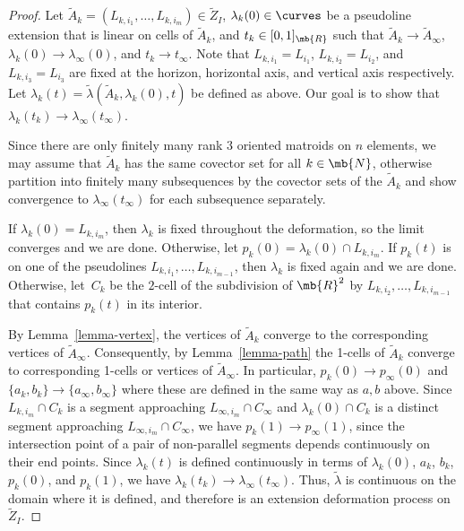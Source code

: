 \begin{proof}
Let $\tilde A_k = (L_{k,i_1},\dots,L_{k,i_m}) \in \tilde Z_{I}$, $\lambda_k(0) \in \curves$ be a pseudoline extension that is linear on cells of $\tilde A_k$, and $t_k \in [0,1]_\mb{R}$ such that $\tilde A_k \to \tilde A_\infty$, $\lambda_k(0) \to \lambda_\infty(0)$, and $t_k \to t_\infty$.
Note that $L_{k,i_1} = L_{i_1}$, $L_{k,i_2} = L_{i_2}$, and $L_{k,i_3} = L_{i_3}$ are fixed at the horizon, horizontal axis, and vertical axis respectively.
Let $\lambda_k(t) = \tilde \lambda(\tilde A_k,\lambda_k(0),t)$ be defined as above.
Our goal is to show that $\lambda_k(t_k) \to \lambda_\infty(t_\infty)$.

Since there are only finitely many rank $3$ oriented matroids on $n$ elements, we may assume that $\tilde A_k$ has the same covector set for all $k \in \mb{N}$, otherwise partition into finitely many subsequences by the covector sets of the $\tilde A_k$ and show convergence to $\lambda_\infty(t_\infty)$ for each subsequence separately.

If $\lambda_k(0) = L_{k,i_m}$, then $\lambda_k$ is fixed throughout the deformation, so the limit converges and we are done.
Otherwise, let $p_k(0) = \lambda_k(0) \cap L_{k,i_m}$.
If $p_{k}(t)$ is on one of the pseudolines $L_{k,i_1},\dots,L_{k,i_{m-1}}$, then $\lambda_k$ is fixed again and we are done.
Otherwise, let~$C_k$ be the $2$-cell of the subdivision of $\mb{R}^2$ by $L_{k,i_2},\dots,L_{k,i_{m-1}}$ that contains $p_{k}(t)$ in its interior.

By Lemma~\ref{lemma-vertex}, the vertices of $\tilde A_k$ converge to the corresponding vertices of $\tilde A_\infty$.
Consequently, by Lemma~\ref{lemma-path} the 1-cells of $\tilde A_k$ converge to corresponding 1-cells or vertices of $\tilde A_\infty$.
In particular, $p_k(0) \to p_\infty(0)$ and $\{a_k,b_k\} \to \{a_\infty,b_\infty\}$ where these are defined in the same way as $a,b$ above.
Since $L_{k,i_m} \cap C_k$ is a segment approaching $L_{\infty,i_m} \cap C_\infty$ and $\lambda_k(0) \cap C_k$ is a distinct segment approaching $L_{\infty,i_m} \cap C_\infty$, we have $p_k(1) \to p_\infty(1)$, since the intersection point of a pair of non-parallel segments depends continuously on their end points.
Since $\lambda_k(t)$ is defined continuously in terms of $\lambda_k(0)$, $a_k$, $b_k$, $p_k(0)$, and $p_k(1)$, we have $\lambda_k(t_k) \to \lambda_\infty(t_\infty)$.
Thus, $\tilde \lambda$ is continuous on the domain where it is defined, and therefore is an extension deformation process on~$\tilde Z_I$.
\end{proof}

